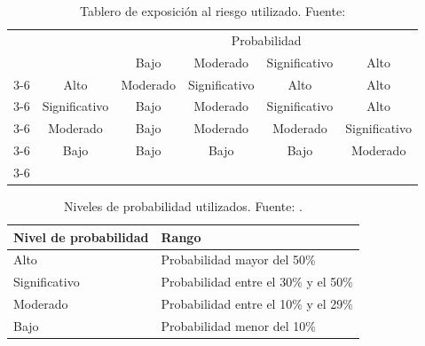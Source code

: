 \documentclass{subfiles}
\begin{document}
\begin{table}[ht]
\centering
\begin{tabular}{cccccc}
                         &                                    & \multicolumn{4}{c}{Probabilidad}                                                                                                             \\
                         &                                    & Bajo                          & Moderado                           & Significativo                      & Alto                               \\ \cline{3-6} 
\multirow{4}{*}{\begin{turn}{90}Impacto\end{turn}} & \multicolumn{1}{c|}{Alto}          & \multicolumn{1}{c|}{Moderado} & \multicolumn{1}{c|}{Significativo} & \multicolumn{1}{c|}{Alto}          & \multicolumn{1}{c|}{Alto}          \\ \cline{3-6} 
                         & \multicolumn{1}{c|}{Significativo} & \multicolumn{1}{c|}{Bajo}     & \multicolumn{1}{c|}{Moderado}      & \multicolumn{1}{c|}{Significativo} & \multicolumn{1}{c|}{Alto}          \\ \cline{3-6} 
                         & \multicolumn{1}{c|}{Moderado}      & \multicolumn{1}{c|}{Bajo}     & \multicolumn{1}{c|}{Moderado}      & \multicolumn{1}{c|}{Moderado}      & \multicolumn{1}{c|}{Significativo} \\ \cline{3-6} 
                         & \multicolumn{1}{c|}{Bajo}          & \multicolumn{1}{c|}{Bajo}     & \multicolumn{1}{c|}{Bajo}          & \multicolumn{1}{c|}{Bajo}          & \multicolumn{1}{c|}{Moderado}      \\ \cline{3-6} 
\end{tabular}
\caption[Tablero de exposición al riesgo utilizado.]{Tablero de exposición al riesgo utilizado. Fuente: }
\label{tab:exposicion_al_riesgo}
\end{table}

\begin{table}[ht]
\centering
\begin{tabular}{ll}
\hline
\textbf{Nivel de probabilidad} & \textbf{Rango}                       \\ \hline
Alto                           & Probabilidad mayor del 50\%          \\ \hline
Significativo                  & Probabilidad entre el 30\% y el 50\% \\ \hline
Moderado                       & Probabilidad entre el 10\% y el 29\% \\ \hline
Bajo                           & Probabilidad menor del 10\%          \\ \hline
\end{tabular}
\caption[Niveles de probabilidad utilizados.]{Niveles de probabilidad utilizados. Fuente: .}
\label{tab:probabilidades_de_riesgos}
\end{table}
\end{document}
